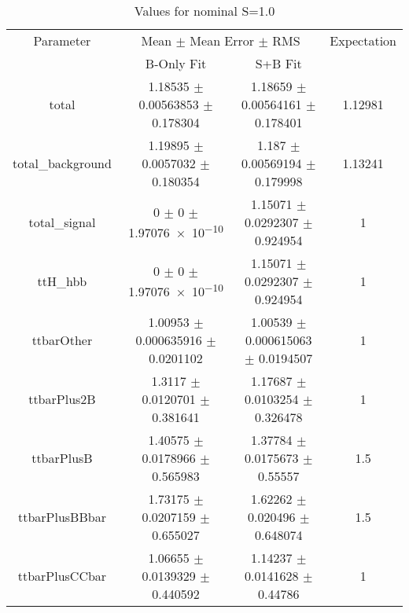 \begin{table}
\centering
\caption{Values for nominal S=1.0}
\begin{tabular}{cccc}
\toprule
Parameter & \multicolumn{2}{c}{Mean $\pm$ Mean Error $\pm$ RMS} & Expectation\\
 & B-Only Fit & S+B Fit & \\
\midrule
total & \num{1.18535} $\pm$ \num{0.00563853} $\pm$ \num{0.178304} & \num{1.18659} $\pm$ \num{0.00564161} $\pm$ \num{0.178401} & \num{1.12981}\\
total\_background & \num{1.19895} $\pm$ \num{0.0057032} $\pm$ \num{0.180354} & \num{1.187} $\pm$ \num{0.00569194} $\pm$ \num{0.179998} & \num{1.13241}\\
total\_signal & \num{0} $\pm$ \num{0} $\pm$ \num{1.97076e-10} & \num{1.15071} $\pm$ \num{0.0292307} $\pm$ \num{0.924954} & \num{1}\\
ttH\_hbb & \num{0} $\pm$ \num{0} $\pm$ \num{1.97076e-10} & \num{1.15071} $\pm$ \num{0.0292307} $\pm$ \num{0.924954} & \num{1}\\
ttbarOther & \num{1.00953} $\pm$ \num{0.000635916} $\pm$ \num{0.0201102} & \num{1.00539} $\pm$ \num{0.000615063} $\pm$ \num{0.0194507} & \num{1}\\
ttbarPlus2B & \num{1.3117} $\pm$ \num{0.0120701} $\pm$ \num{0.381641} & \num{1.17687} $\pm$ \num{0.0103254} $\pm$ \num{0.326478} & \num{1}\\
ttbarPlusB & \num{1.40575} $\pm$ \num{0.0178966} $\pm$ \num{0.565983} & \num{1.37784} $\pm$ \num{0.0175673} $\pm$ \num{0.55557} & \num{1.5}\\
ttbarPlusBBbar & \num{1.73175} $\pm$ \num{0.0207159} $\pm$ \num{0.655027} & \num{1.62262} $\pm$ \num{0.020496} $\pm$ \num{0.648074} & \num{1.5}\\
ttbarPlusCCbar & \num{1.06655} $\pm$ \num{0.0139329} $\pm$ \num{0.440592} & \num{1.14237} $\pm$ \num{0.0141628} $\pm$ \num{0.44786} & \num{1}\\
\bottomrule
\end{tabular}
\end{table}